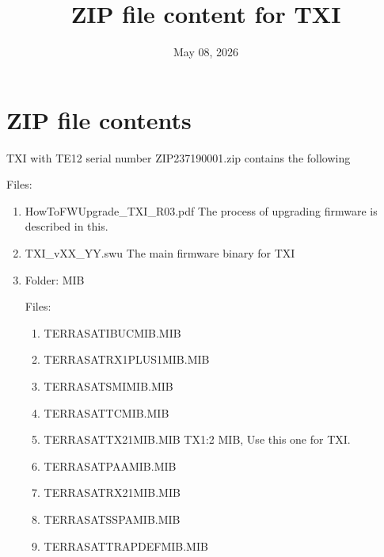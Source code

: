 \documentclass[letterpaper,10pt,english]{sphinxhowto}
\title{ZIP file content for TXI}
\date{May 08, 2026}
\author{}
\begin{document}
\pagestyle{empty}

\pagestyle{plain}

\pagestyle{normal}
\label{\detokenize{index::doc}}


\sphinxstepscope


\section{ZIP file contents}
\label{\detokenize{topics/zip_contents:zip-file-contents}}\label{\detokenize{topics/zip_contents::doc}}
\sphinxAtStartPar
TXI with TE12 serial number ZIP\sphinxhyphen{}23719\sphinxhyphen{}0001.zip contains the following

\sphinxAtStartPar
Files:
\begin{enumerate}
%
\item {} 
\sphinxAtStartPar
HowToFWUpgrade\_TXI\_R03.pdf \sphinxhyphen{} The process of upgrading firmware is described in this.

\item {} 
\sphinxAtStartPar
TXI\_vXX\_YY.swu             \sphinxhyphen{} The main firmware binary for TXI

\item {} 
\sphinxAtStartPar
Folder: MIB

\sphinxAtStartPar
Files:
\begin{enumerate}
%
\item {} 
\sphinxAtStartPar
TERRASAT\sphinxhyphen{}IBUC\sphinxhyphen{}MIB.MIB

\item {} 
\sphinxAtStartPar
TERRASAT\sphinxhyphen{}RX1PLUS1\sphinxhyphen{}MIB.MIB

\item {} 
\sphinxAtStartPar
TERRASAT\sphinxhyphen{}SMI\sphinxhyphen{}MIB.MIB

\item {} 
\sphinxAtStartPar
TERRASAT\sphinxhyphen{}TC\sphinxhyphen{}MIB.MIB

\item {} 
\sphinxAtStartPar
TERRASAT\sphinxhyphen{}TX\sphinxhyphen{}2\sphinxhyphen{}1\sphinxhyphen{}MIB.MIB \sphinxhyphen{} TX1:2 MIB, Use this one for TXI.

\item {} 
\sphinxAtStartPar
TERRASAT\sphinxhyphen{}PAA\sphinxhyphen{}MIB.MIB

\item {} 
\sphinxAtStartPar
TERRASAT\sphinxhyphen{}RX\sphinxhyphen{}2\sphinxhyphen{}1\sphinxhyphen{}MIB.MIB

\item {} 
\sphinxAtStartPar
TERRASAT\sphinxhyphen{}SSPA\sphinxhyphen{}MIB.MIB

\item {} 
\sphinxAtStartPar
TERRASAT\sphinxhyphen{}TRAPDEF\sphinxhyphen{}MIB.MIB

\end{enumerate}

\end{enumerate}



\renewcommand{\indexname}{Index}
\printindex
\end{document}
